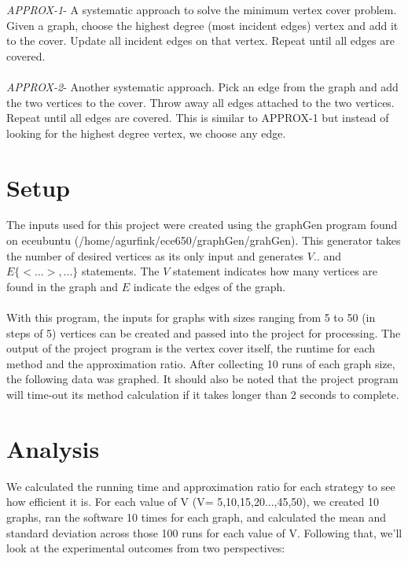 \documentclass[11pt roman]{article}
\begin{document}
\emph{APPROX-1}- A systematic approach to solve the minimum vertex cover problem. Given a graph, choose the highest degree (most incident edges) vertex and add it to the cover. Update all incident edges on that vertex. Repeat until all edges are covered.\\\\

\emph{APPROX-2}- Another systematic approach. Pick an edge from the graph and add the two vertices to the cover. Throw away all edges attached to the two vertices. Repeat until all edges are covered. This is similar to APPROX-1 but instead of looking for the highest degree vertex, we choose any edge.

\section{Setup}
The inputs used for this project were created using the graphGen program found on eceubuntu (/home/agurfink/ece650/graphGen/grahGen). This generator takes the number of desired vertices as its only input and generates $V..$ and $E \{<...>,...\}$ statements. The $V$ statement indicates how many vertices are found in the graph and $E$ indicate the edges of the graph. \\\\

With this program, the inputs for graphs with sizes ranging from 5 to 50 (in steps of 5) vertices can be created and passed into the project for processing. The output of the project program is the vertex cover itself, the runtime for each method and the approximation ratio. After collecting 10 runs of each graph size, the following data was graphed. It should also be noted that the project program will time-out its method calculation if it takes longer than 2 seconds to complete.
\section{Analysis}
\graphicspath{ {../} } %


We calculated the running time and approximation ratio for each strategy to see how efficient it is. For each value of V (V= 5,10,15,20...,45,50), we created 10 graphs, ran the software 10 times for each graph, and calculated the mean and standard deviation across those 100 runs for each value of V. Following that, we'll look at the experimental outcomes from two perspectives: \\
\end{document}
